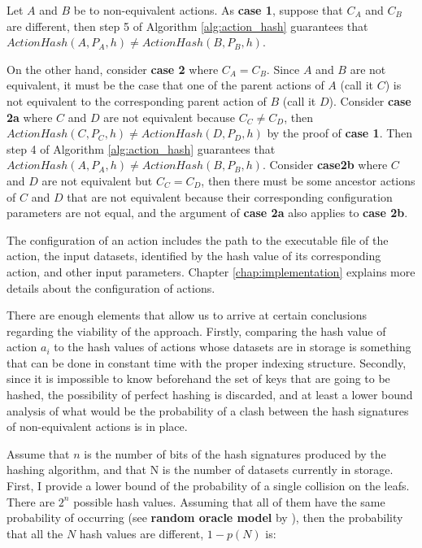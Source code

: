 Let $A$ and $B$ be to non-equivalent actions.  As \textbf{case 1}, suppose that $C_A$ and $C_B$ are different, then step 5 of Algorithm \ref{alg:action_hash} guarantees that $ActionHash(A, P_A, h) \neq ActionHash(B, P_B, h)$. 

On the other hand, consider \textbf{case 2} where $C_A = C_B$.  Since $A$ and $B$ are not equivalent, it must be the case that one of the parent actions of $A$ (call it $C$) is not equivalent to the corresponding parent action of $B$ (call it $D$). Consider \textbf{case 2a} where $C$ and $D$ are not equivalent because $C_C \neq C_D$,  then $ActionHash(C, P_C, h) \neq ActionHash(D, P_D, h)$ by the proof of \textbf{case 1}.  Then step 4 of Algorithm \ref{alg:action_hash} guarantees that $ActionHash(A, P_A, h) \neq ActionHash(B, P_B, h)$. Consider \textbf{case2b} where $C$ and $D$ are not equivalent but $C_C = C_D$, then there must be some ancestor actions of $C$ and $D$ that are not equivalent because their corresponding configuration parameters are not equal, and the argument of \textbf{case 2a} also applies to \textbf{case 2b}.

The configuration of an action includes the path to the executable file of the action, the input datasets, identified by the hash value of its corresponding action, and other input parameters. Chapter \ref{chap:implementation} explains more details about the configuration of actions.

There are enough elements that allow us to arrive at certain conclusions regarding the viability of the approach.  Firstly, comparing the hash value of action $a_i$ to the hash values of actions whose datasets are in storage is something that can be done in constant time with the proper indexing structure.  Secondly, since it is impossible to know beforehand the set of keys that are going to be hashed, the possibility of perfect hashing is discarded, and at least a lower bound analysis of what would be the probability of a clash between the hash signatures of non-equivalent actions is in place.  

Assume that $n$ is the number of bits of the hash signatures produced by the hashing algorithm, and that N is the number of datasets currently in storage.  First, I provide a lower bound of the probability of a single collision on the leafs. There are $2^n$ possible hash values.  Assuming that all of them have the same probability of occurring (see \textbf{random oracle model} by \cite{bellare1993random}), then the probability that all the $N$ hash values are different, $1 - p(N)$ is:

